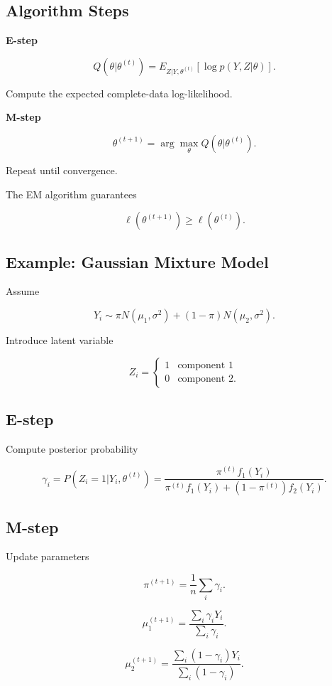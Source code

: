 \documentclass[a4paper,10pt]{article}
\begin{document}
\subsection{Algorithm Steps}

\textbf{E-step}

\[
Q(\theta|\theta^{(t)})
=
E_{Z|Y,\theta^{(t)}}[
\log p(Y,Z|\theta)
].
\]

Compute the expected complete-data log-likelihood.

\textbf{M-step}

\[
\theta^{(t+1)}
=
\arg\max_\theta Q(\theta|\theta^{(t)}).
\]

Repeat until convergence.

The EM algorithm guarantees

\[
\ell(\theta^{(t+1)}) \ge \ell(\theta^{(t)}).
\]

\subsection{Example: Gaussian Mixture Model}

Assume

\[
Y_i \sim \pi N(\mu_1,\sigma^2) + (1-\pi)N(\mu_2,\sigma^2).
\]

Introduce latent variable

\[
Z_i =
\begin{cases}
1 & \text{component 1} \\
0 & \text{component 2}.
\end{cases}
\]

\subsection{E-step}

Compute posterior probability

\[
\gamma_i
=
P(Z_i=1|Y_i,\theta^{(t)})
=
\frac{
\pi^{(t)} f_1(Y_i)
}{
\pi^{(t)} f_1(Y_i) + (1-\pi^{(t)}) f_2(Y_i)
}.
\]

\subsection{M-step}

Update parameters

\[
\pi^{(t+1)}
=
\frac{1}{n}\sum_i \gamma_i.
\]

\[
\mu_1^{(t+1)}
=
\frac{\sum_i \gamma_i Y_i}{\sum_i \gamma_i}.
\]

\[
\mu_2^{(t+1)}
=
\frac{\sum_i (1-\gamma_i)Y_i}{\sum_i (1-\gamma_i)}.
\]
\end{document}
